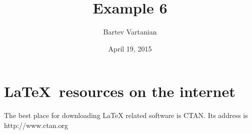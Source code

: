 \documentclass{article}
\begin{document}
\title{Example 6}
\author{Bartev Vartanian}
\date{April 19, 2015}

\maketitle

\section{\sffamily\LaTeX\ resources on the internet}
The best place for downloading LaTeX related software is CTAN.
Its address is \ttfamily http://www.ctan.org\rmfamily
\end{document}
